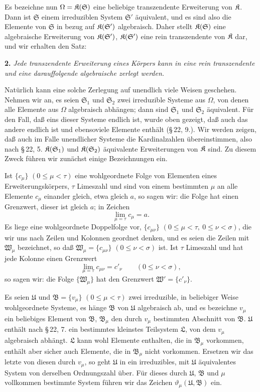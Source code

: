 Es bezeichne nun \(\Omega=\mathfrak K(\mathfrak S)\) eine beliebige transzendente Erweiterung von \(\mathfrak K\). Dann ist \(\mathfrak S\) einem irreduziblen System \(\mathfrak S'\) äquivalent, und es sind also die Elemente von \(\mathfrak S\) in bezug auf \(\mathfrak K(\mathfrak S')\) algebraisch. Daher stellt \(\mathfrak K(\mathfrak S)\) eine algebraische Erweiterung von \(\mathfrak K(\mathfrak S')\), \(\mathfrak K(\mathfrak S')\) eine rein transzendente von \(\mathfrak K\) dar, und wir erhalten den Satz:

\textbf{2.} \emph{Jede transzendente Erweiterung eines Körpers kann in eine rein transzendente und eine darauffolgende algebraische zerlegt werden.}

Natürlich kann eine solche Zerlegung auf unendlich viele Weisen geschehen. Nehmen wir an, es seien \(\mathfrak S_1\) und \(\mathfrak S_2\) zwei irreduzible Systeme aus \(\Omega\), von denen alle Elemente aus \(\Omega\) algebraisch abhängen; dann sind \(\mathfrak S_1\) und \(\mathfrak S_2\) äquivalent. Für den Fall, daß eins dieser Systeme endlich ist, wurde oben gezeigt, daß auch das andere endlich ist und ebensoviele Elemente enthält (\S\,22, 9.). Wir werden zeigen, daß auch im Falle unendlicher Systeme die Kardinalzahlen übereinstimmen, also nach \S\,22, 5. \(\mathfrak K(\mathfrak S_1)\) und \(\mathfrak K(\mathfrak S_2)\) äquivalente Erweiterungen von \(\mathfrak K\) sind. Zu diesem Zweck führen wir zunächst einige Bezeichnungen ein.

Ist \(\{c_\mu\}\) \((0\leq\mu<\tau)\) eine wohlgeordnete Folge von Elementen eines Erweiterungskörpers, \(\tau\) Limeszahl und sind von einem bestimmten \(\mu\) an alle Elemente \(c_\mu\) einander gleich, etwa gleich \(a\), so sagen wir: die Folge hat einen Grenzwert, dieser ist gleich \(a\); in Zeichen
\[
\lim_{\mu=\tau} c_\mu=a.
\]
Es liege eine wohlgeordnete Doppelfolge vor, \(\{c_{\mu\nu}\}\) \((0\leq\mu<\tau,\ 0\leq\nu<\sigma)\), die wir uns nach Zeilen und Kolonnen geordnet denken, und es seien die Zeilen mit \(\mathfrak W_\mu\) bezeichnet, so daß \(\mathfrak W_\mu=\{c_{\mu\nu}\}\) \((0\leq\nu<\sigma)\) ist. Ist \(\tau\) Limeszahl und hat jede Kolonne einen Grenzwert
\[
\lim_{\mu=\tau}c_{\mu\nu}=c'_{\nu}\qquad(0\leq\nu<\sigma),
\]
so sagen wir: die Folge \(\{\mathfrak W_\mu\}\) hat den Grenzwert \(\mathfrak W'=\{c'_{\nu}\}\).

Es seien \(\mathfrak U\) und \(\mathfrak B=\{v_\mu\}\) \((0\leq\mu<\tau)\) zwei irreduzible, in beliebiger Weise wohlgeordnete Systeme, es hänge \(\mathfrak B\) von \(\mathfrak U\) algebraisch ab, und es bezeichne \(v_\mu\) ein beliebiges Element von \(\mathfrak B\), \(\mathfrak B_\mu\) den durch \(v_\mu\) bestimmten Abschnitt von \(\mathfrak B\). \(\mathfrak U\) enthält nach \S\,22, 7. ein bestimmtes kleinstes Teilsystem \(\mathfrak L\), von dem \(v_\mu\) algebraisch abhängt. \(\mathfrak L\) kann wohl Elemente enthalten, die in \(\mathfrak B_\mu\) vorkommen, enthält aber sicher auch Elemente, die in \(\mathfrak B_\mu\) nicht vorkommen. Ersetzen wir das letzte von diesen durch \(v_\mu\), so geht \(\mathfrak U\) in ein irreduzibles, mit \(\mathfrak U\) äquivalentes System von derselben Ordnungszahl über. Für dieses durch \(\mathfrak U\), \(\mathfrak B\) und \(\mu\) vollkommen bestimmte System führen wir das Zeichen \(\vartheta_\mu(\mathfrak U,\mathfrak B)\) ein.

